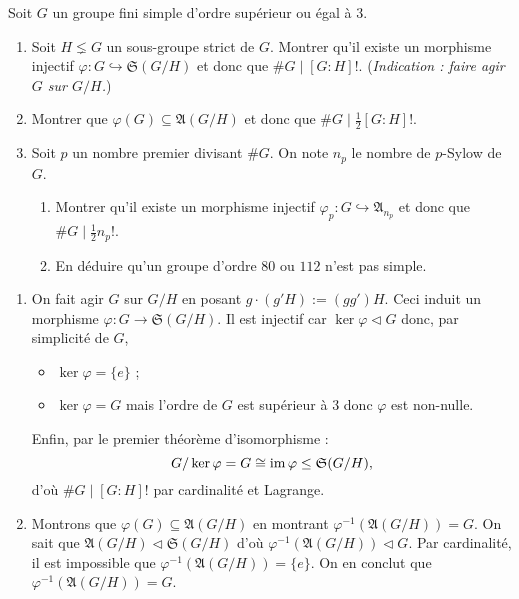 \documentclass[./main]{subfiles}
\begin{document}
  \begin{enonce}
    Soit $G$ un groupe fini simple d'ordre supérieur ou égal à $3$.
    \begin{enumerate}
      \item Soit $H \lneq G$ un sous-groupe strict de $G$. Montrer qu'il existe un morphisme injectif $\varphi : G \hookrightarrow \mathfrak{S}(G / H)$ et donc que  $\# G  \mid [G : H]!$. (\textit{Indication : faire agir $G$ sur $G / H$.})
      \item Montrer que $\varphi(G) \subseteq \mathfrak{A}(G / H)$ et donc que $\#G  \mid \frac{1}{2} [G:H]!$.
      \item Soit $p$ un nombre premier divisant $\#G$. On note $n_p$ le nombre de $p$-Sylow de $G$.
        \begin{enumerate}
          \item Montrer qu'il existe un morphisme injectif $\varphi_p : G \hookrightarrow \mathfrak{A}_{n_p}$ et donc que $\# G  \mid \frac{1}{2} n_p!$.
          \item En déduire qu'un groupe d'ordre $80$ ou $112$ n'est pas simple.
        \end{enumerate}
    \end{enumerate}
  \end{enonce}

  \begin{enumerate}
    \item On fait agir $G$ sur $G / H$ en posant $g \cdot (g'H) := (g g')H$.
      Ceci induit un morphisme $\varphi : G \to \mathfrak{S}(G / H)$.
      Il est injectif car $\ker \varphi \triangleleft G$ donc, par simplicité de $G$,
       \begin{itemize}
        \item $\ker \varphi = \{e\}$ ;
        \item $\ker \varphi = G$ mais l'ordre de  $G$ est supérieur à $3$ donc $\varphi$ est non-nulle.
      \end{itemize}
      Enfin, par le premier théorème d'isomorphisme :
      \[
        G / \ker \varphi = G \cong \operatorname{im} \varphi \le \mathfrak{S}(G / H)
      ,\] 
      d'où $\# G  \mid [G : H]!$ par cardinalité et Lagrange.
    \item Montrons que $\varphi(G) \subseteq \mathfrak{A}(G / H)$ en montrant $\varphi^{-1}(\mathfrak{A}(G / H)) = G$.
      On sait que $\mathfrak{A}(G / H) \triangleleft \mathfrak{S}(G / H)$ d'où  $\varphi^{-1}(\mathfrak{A}(G / H)) \triangleleft G$.
      Par cardinalité, il est impossible que $\varphi ^{-1}(\mathfrak{A}(G / H)) = \{e\}$.
      On en conclut que $\varphi ^{-1}(\mathfrak{A}(G / H)) = G$.
  \end{enumerate}
\end{document}
